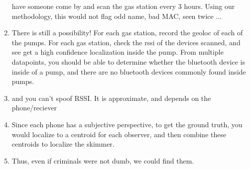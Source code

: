 \begin{enumerate}
   have someone come by and scan the gas station every 3 hours. Using our
   methodology, this would not flag odd name, bad MAC, seen twice ... 
\item    There is still a possibility! For each gas station, record the geoloc
   of each of the pumps. For each gas station, check the rssi of the devices
   scanned, and see get a high confidence localization inside the pump. From
   multiple datapoints, you should be able to determine whether the bluetooth
   device is inside of a pump, and there are no bluetooth devices commonly found
   inside pumps.
\item    and you can't spoof RSSI. It is approximate, and depends on the phone/reciever
\item    Since each phone has a subjective perspective, to get the ground truth, you
   would localize to a centroid for each observer, and then combine these centroids
   to localize the skimmer.
\item    Thus, even if criminals were not dumb, we could find them.
\end{enumerate}
\fi

